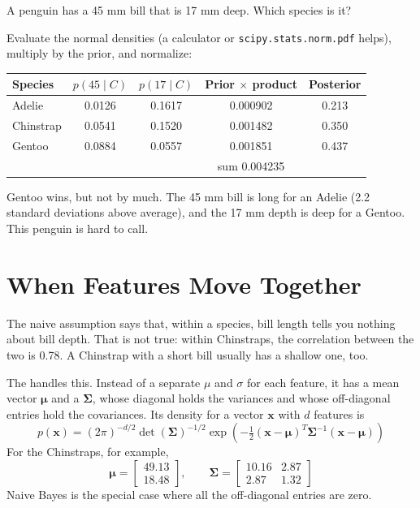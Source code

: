 \begin{Worked}
\begin{Problem}
A penguin has a 45 mm bill that is 17 mm deep. Which species is it?
\end{Problem}
\begin{Solution}
Evaluate the normal densities (a calculator or \verb|scipy.stats.norm.pdf| helps), multiply by
the prior, and normalize:

\begin{center}
\begin{tabular}{l c c c c}
\textbf{Species} & $p(45 \mid C)$ & $p(17 \mid C)$ & \textbf{Prior $\times$ product} & \textbf{Posterior} \\
\hline
Adelie & 0.0126 & 0.1617 & 0.000902 & 0.213 \\
Chinstrap & 0.0541 & 0.1520 & 0.001482 & 0.350 \\
Gentoo & 0.0884 & 0.0557 & 0.001851 & 0.437 \\
\hline
 & & & sum 0.004235 & \\
\end{tabular}
\end{center}

Gentoo wins, but not by much. The 45 mm bill is long for an Adelie (2.2 standard deviations above average),
and the 17 mm depth is deep for a Gentoo. This penguin is hard to call.
\end{Solution}
\end{Worked}

\section{When Features Move Together}
The naive assumption says that, within a species, bill length tells you nothing about bill depth. That is not
true: within Chinstraps, the correlation between the two is 0.78. A Chinstrap with a short bill usually has a
shallow one, too.

The  handles this. Instead of a separate $\mu$ and $\sigma$ for each
feature, it has a mean vector $\boldsymbol{\mu}$ and a  $\boldsymbol{\Sigma}$, whose
diagonal holds the variances and whose off-diagonal entries hold the covariances. Its density for a vector
$\mathbf{x}$ with $d$ features is
$$p(\mathbf{x}) = (2\pi)^{-d/2}\det(\boldsymbol{\Sigma})^{-1/2} \exp\left(-\tfrac{1}{2}(\mathbf{x} -
\boldsymbol{\mu})^T \boldsymbol{\Sigma}^{-1}(\mathbf{x} - \boldsymbol{\mu})\right)$$
For the Chinstraps, for example,
$$\boldsymbol{\mu} = \begin{bmatrix} 49.13 \\ 18.48 \end{bmatrix}, \qquad
\boldsymbol{\Sigma} = \begin{bmatrix} 10.16 & 2.87 \\ 2.87 & 1.32 \end{bmatrix}$$
Naive Bayes is the special case where all the off-diagonal entries are zero.

